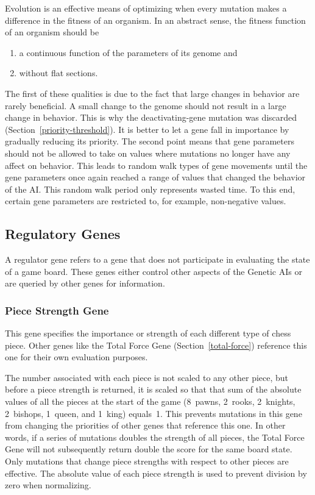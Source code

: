 \documentclass[letterpaper]{article}
\renewcommand{\_}{\allowbreak\textunderscore\allowbreak}
\begin{document}
Evolution is an effective means of optimizing when every mutation makes a difference in the fitness of an organism. In an abstract sense, the fitness function of an organism should be
\begin{enumerate}
	\item a continuous function of the parameters of its genome and
	\item without flat sections.
\end{enumerate}
The first of these qualities is due to the fact that large changes in behavior are rarely beneficial. A small change to the genome should not result in a large change in behavior. This is why the deactivating-gene mutation was discarded (Section~\ref{priority-threshold}). It is better to let a gene fall in importance by gradually reducing its priority. The second point means that gene parameters should not be allowed to take on values where mutations no longer have any affect on behavior. This leads to random walk types of gene movements until the gene parameters once again reached a range of values that changed the behavior of the AI\@. This random walk period only represents wasted time. To this end, certain gene parameters are restricted to, for example, non-negative values.

\subsection{Regulatory Genes}
A regulator gene refers to a gene that does not participate in evaluating the state of a game board. These genes either control other aspects of the Genetic AIs or are queried by other genes for information.

\subsubsection{Piece Strength Gene}\label{piece-strength}

This gene specifies the importance or strength of each different type of chess piece. Other genes like the Total Force Gene (Section~\ref{total-force}) reference this one for their own evaluation purposes.

The number associated with each piece is not scaled to any other piece, but before a piece strength is returned, it is scaled so that that sum of the absolute values of all the pieces at the start of the game (8~pawns, 2~rooks, 2~knights, 2~bishops, 1~queen, and 1~king) equals~1. This prevents mutations in this gene from changing the priorities of other genes that reference this one. In other words, if a series of mutations doubles the strength of all pieces, the Total Force Gene will not subsequently return double the score for the same board state. Only mutations that change piece strengths with respect to other pieces are effective. The absolute value of each piece strength is used to prevent division by zero when normalizing.
\end{document}
